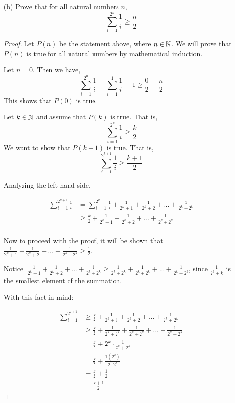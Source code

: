 \documentclass[12pt, a4paper]{amsart}
\theoremstyle{definition}
\theoremstyle{remark}
\numberwithin{Theorem}{section}
\begin{document}
\begin{enumerate}
\begin{proof}
    \end{proof}
    
    \item[(b)] Prove that for all natural numbers $n$,
    $$\sum_{i = 1}^{2^n} \frac{1}{i} \geq \frac{n}{2}$$ 
     
    \begin{proof}
    
    Let $P(n)$ be the statement above, where $n \in \mathbb N$. 
    We will prove that $P(n)$ is true for all natural numbers by mathematical induction.
     
    \base 
     
    Let $n = 0$.
    Then we have,
    $$\sum_{i = 1}^{2^0} \frac{1}{i} = \sum_{i = 1}^{1} \frac{1}{i} = 1 \geq \frac{0}{2} = \frac{n}{2}$$
    This shows that $P(0)$ is true.
     
    \istep
     
    Let $k \in \mathbb N$ and assume that $P(k)$ is true. That is, 
    $$\sum_{i = 1}^{2^k} \frac{1}{i} \geq \frac{k}{2}$$
    We want to show that $P(k+1)$ is true. That is,
    $$\sum_{i = 1}^{2^{k+1}} \frac{1}{i} \geq \frac{k+1}{2}$$

    Analyzing the left hand side,
    
    \begin{align*}
        \sum_{i=1}^{2^{k+1}} \frac{1}{i} &= \sum_{i=1}^{2^k} \frac{1}{i} + \frac{1}{2^k + 1} + \frac{1}{2^k + 2} + ... + \frac{1}{2^k + 2^k} \\
        &\geq \frac{k}{2}+ \frac{1}{2^k + 1} + \frac{1}{2^k + 2} + ... + \frac{1}{2^k + 2^k} \tag{By induction Hypothesis} \\
    \end{align*}
    
    Now to proceed with the proof, it will be shown that $\frac{1}{2^k + 1} + \frac{1}{2^k + 2} + ... + \frac{1}{2^k + 2^k} \geq \frac{1}{2}$.
    
    Notice,  $\frac{1}{2^k + 1} + \frac{1}{2^k + 2} + ... + \frac{1}{2^k + 2^k} \geq \frac{1}{2^k + 2^k} + \frac{1}{2^k + 2^k} + ... + \frac{1}{2^k + 2^k}$, since $\frac{1}{2^k + k}$ is the smallest element of the summation. 
    
 \newpage
    
    With this fact in mind:
    
    \begin{align*}
        \sum_{i=1}^{2^{k+1}} &\geq \frac{k}{2}+ \frac{1}{2^k + 1} + \frac{1}{2^k + 2} + ... + \frac{1}{2^k + 2^k} \\
        &\geq \frac{k}{2} + \frac{1}{2^k + 2^k} + \frac{1}{2^k + 2^k} + ... + \frac{1}{2^k + 2^k} \\
        &= \frac{k}{2} + 2^k \cdot \frac{1}{2^k + 2^k}\\
        &= \frac{k}{2} + \frac{1(2^k)}{2 \cdot 2^k} \\
        &= \frac{k}{2} + \frac{1}{2} \\
        &= \frac{k+1}{2}
    \end{align*}
    

\end{proof}
\end{enumerate}
\end{document}
